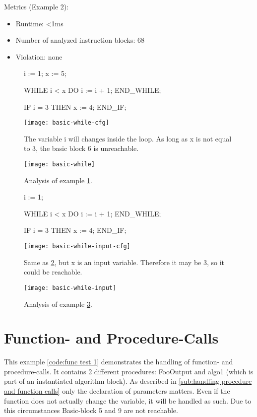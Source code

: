 Metrics (Example 2):
\begin{itemize}
	\item Runtime: <1ms
	\item Number of analyzed instruction blocks: 68
	\item Violation: none
\end{itemize}


\begin{figure}[h!]
	\begin{GenericCode}
		i := 1;
		x := 5;
		
		WHILE i < x DO
			i := i + 1;
		END_WHILE;
		
		IF i = 3 THEN
			x := 4;
		END_IF;		\end{GenericCode}
	\centering
	\texttt{[image: basic-while-cfg]}
	\caption{The variable i will changes inside the loop. As long as x is not equal to 3, the basic block 6 is unreachable. }
	\label{code:loop example 1 cfg}
\end{figure}
\begin{figure}[h!]
	\centering
	\texttt{[image: basic-while]}
	\caption{Analysis of example \ref{code:loop example 1 cfg}. }
	\label{code:loop example 1}
\end{figure}
\begin{figure}[h!]
	\begin{GenericCode}
		i := 1;
		
		WHILE i < x DO
			i := i + 1;
		END_WHILE;
		
		IF i = 3 THEN
			x := 4;
		END_IF;		\end{GenericCode}
	\centering
	\texttt{[image: basic-while-input-cfg]}
	\caption{Same as \ref{code:loop example 1}, but x is an input variable. Therefore it may be 3, so it could be reachable.}
	\label{code:loop example 2 cfg}
\end{figure}
\begin{figure}[h!]
	\centering
	\texttt{[image: basic-while-input]}
	\caption{Analysis of example \ref{code:loop example 2 cfg}.}
	\label{code:loop example 2}
\end{figure}
\section{Function- and Procedure-Calls}
This example \ref{code:func test 1} demonstrates the handling of function- and procedure-calls. It contains 2 different procedures: FooOutput and algo1 (which is part of an instantiated algorithm block). 
As described in \ref{sub:handling procedure and function calls} only the declaration of parameters matters. Even if the function does not actually change the variable, it will be handled as such. 
Due to this circumstances Basic-block 5 and 9 are not reachable.


